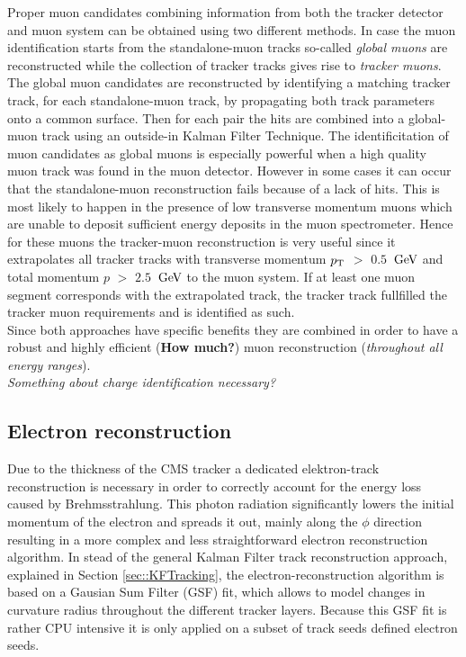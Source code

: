 Proper muon candidates combining information from both the tracker detector and muon system can be obtained using two different methods. In case the muon identification starts from the standalone-muon tracks so-called \textit{global muons} are reconstructed while the collection of tracker tracks gives rise to \textit{tracker muons}.
The global muon candidates are reconstructed by identifying a matching tracker track, for each standalone-muon track, by propagating both track parameters onto a common surface. Then for each pair the hits are combined into a global-muon track using an outside-in Kalman Filter Technique. The identificitation of muon candidates as global muons is especially powerful when a high quality muon track was found in the muon detector. However in some cases it can occur that the standalone-muon reconstruction fails because of a lack of hits. This is most likely to happen in the presence of low transverse momentum muons which are unable to deposit sufficient energy deposits in the muon spectrometer. Hence for these muons the tracker-muon reconstruction is very useful since it extrapolates all tracker tracks with transverse momentum $p_{\rm T}$ $>$ $0.5$ $\, \mathrm{GeV}$ and total momentum $p$ $>$ $2.5$ $\, \mathrm{GeV}$ to the muon system. If at least one muon segment corresponds with the extrapolated track, the tracker track fullfilled the tracker muon requirements and is identified as such.
\\
Since both approaches have specific benefits they are combined in order to have a robust and highly efficient (\textbf{How much?}) muon reconstruction (\textit{throughout all energy ranges}).
\\
\textit{Something about charge identification necessary?}
 
\subsection{Electron reconstruction} \label{subsec::Electron}

Due to the thickness of the CMS tracker a dedicated elektron-track reconstruction is necessary in order to correctly account for the energy loss caused by Brehmsstrahlung. 
This photon radiation significantly lowers the initial momentum of the electron and spreads it out, mainly along the $\phi$ direction resulting in a more complex and less straightforward electron reconstruction algorithm.
In stead of the general Kalman Filter track reconstruction approach, explained in Section \ref{sec::KFTracking}, the electron-reconstruction algorithm is based on a Gausian Sum Filter (GSF) fit, which allows to model changes in curvature radius throughout the different tracker layers. Because this GSF fit is rather CPU intensive it is only applied on a subset of track seeds defined electron seeds.

